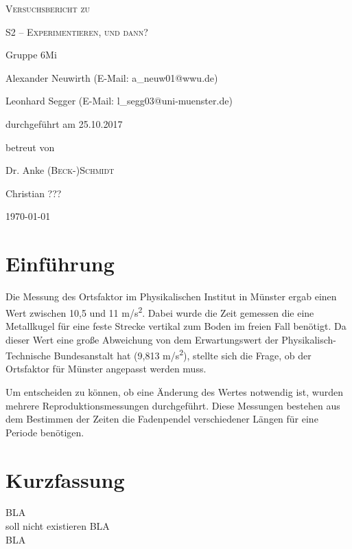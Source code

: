 \documentclass[
	a4paper,
	12pt,
	pagesize,
	ngerman
]{scrartcl}
\begin{document}
	\begin{titlepage}
		\centering
		{\scshape\LARGE Versuchsbericht zu \par}
		\vspace{1cm}
		{\scshape\huge S2 -- Experimentieren, und dann?\par}
		\vspace{2.5cm}
		{\LARGE Gruppe 6Mi \par}
		\vspace{0.5cm}
		
		{\large Alexander Neuwirth (E-Mail: a\_neuw01@wwu.de) \par}
		{\large Leonhard Segger (E-Mail: l\_segg03@uni-muenster.de) \par}
		\vfill
		
		durchgeführt am 25.10.2017\par
		betreut von\par
		{\large Dr. Anke \textsc{(Beck-)Schmidt}} \par%
		{\large Christian \textsc{???}} %
		
		\vfill
		
		{\large \today\par}
	\end{titlepage}
	\tableofcontents
	
	\newpage
	\section{Einführung}
	
	Die Messung des Ortsfaktor im Physikalischen Institut in Münster ergab einen Wert zwischen 10,5 und 11 \si{m/s^2}. Dabei wurde die Zeit gemessen die eine Metallkugel für eine feste Strecke vertikal zum Boden im freien Fall benötigt. Da dieser Wert eine große Abweichung von dem Erwartungswert der Physikalisch-Technische Bundesanstalt hat (9,813 \si{m/s^2}), stellte sich die Frage, ob der Ortsfaktor für Münster angepasst werden muss.\par %
	Um entscheiden zu können, ob eine Änderung des Wertes notwendig ist, wurden mehrere Reproduktionsmessungen durchgeführt. Diese Messungen bestehen aus dem Bestimmen der Zeiten die Fadenpendel verschiedener Längen für eine Periode benötigen.  
	
	\newpage
	\section{Kurzfassung}
	BLA  \\ soll nicht existieren
	BLA  \\
	BLA
\end{document}
